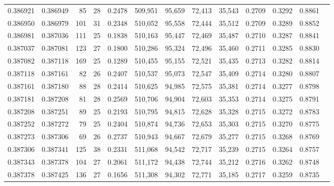 \begin{tabular}{rrrrrrrrrrrrr}
0.386921 & 0.386949 &    85 &  28 &                                     0.2478 & 509,951 &  95,659 &  72,413 &  35,543 & 0.2709 & 0.3292 & 0.8861 \\
0.386950 & 0.386979 &   101 &  31 &                                     0.2348 & 510,052 &  95,558 &  72,444 &  35,512 & 0.2709 & 0.3289 & 0.8852 \\
0.386981 & 0.387036 &   111 &  25 &                                     0.1838 & 510,163 &  95,447 &  72,469 &  35,487 & 0.2710 & 0.3287 & 0.8841 \\
0.387037 & 0.387081 &   123 &  27 &                                     0.1800 & 510,286 &  95,324 &  72,496 &  35,460 & 0.2711 & 0.3285 & 0.8830 \\
0.387082 & 0.387118 &   169 &  25 &                                     0.1289 & 510,455 &  95,155 &  72,521 &  35,435 & 0.2713 & 0.3282 & 0.8814 \\
0.387118 & 0.387161 &    82 &  26 &                                     0.2407 & 510,537 &  95,073 &  72,547 &  35,409 & 0.2714 & 0.3280 & 0.8807 \\
0.387161 & 0.387180 &    88 &  28 &                                     0.2414 & 510,625 &  94,985 &  72,575 &  35,381 & 0.2714 & 0.3277 & 0.8798 \\
0.387181 & 0.387208 &    81 &  28 &                                     0.2569 & 510,706 &  94,904 &  72,603 &  35,353 & 0.2714 & 0.3275 & 0.8791 \\
0.387208 & 0.387251 &    89 &  25 &                                     0.2193 & 510,795 &  94,815 &  72,628 &  35,328 & 0.2715 & 0.3272 & 0.8783 \\
0.387252 & 0.387272 &    79 &  25 &                                     0.2404 & 510,874 &  94,736 &  72,653 &  35,303 & 0.2715 & 0.3270 & 0.8775 \\
0.387273 & 0.387306 &    69 &  26 &                                     0.2737 & 510,943 &  94,667 &  72,679 &  35,277 & 0.2715 & 0.3268 & 0.8769 \\
0.387306 & 0.387341 &   125 &  38 &                                     0.2331 & 511,068 &  94,542 &  72,717 &  35,239 & 0.2715 & 0.3264 & 0.8757 \\
0.387343 & 0.387378 &   104 &  27 &                                     0.2061 & 511,172 &  94,438 &  72,744 &  35,212 & 0.2716 & 0.3262 & 0.8748 \\
0.387378 & 0.387425 &   136 &  27 &                                     0.1656 & 511,308 &  94,302 &  72,771 &  35,185 & 0.2717 & 0.3259 & 0.8735 \\

\end{tabular}
